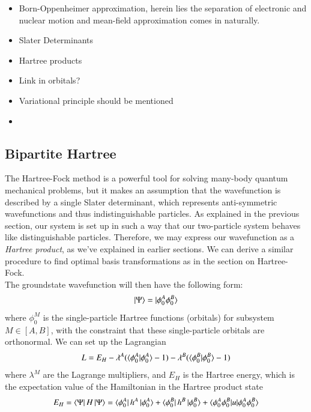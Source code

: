 \documentclass{subfiles}
\begin{document}
\begin{itemize}
    \item Born-Oppenheimer approximation, herein lies the separation of electronic and nuclear motion and mean-field approximation comes in naturally.
    \item Slater Determinants
    \item Hartree products
    \item Link in orbitals?
    \item Variational principle should be mentioned
    \item 
\end{itemize}

\subsection{Bipartite Hartree}\label{sec:bipartite_H}
The Hartree-Fock method is a powerful tool for solving many-body quantum mechanical problems, but it makes an assumption that the wavefunction is described by a single Slater determinant, which represents anti-symmetric wavefunctions and thus indistinguishable particles. As explained in the previous section, our system is set up in such a way that our two-particle system behaves like distinguishable particles. Therefore, we may express our wavefunction as a \emph{Hartree product}, as we've explained in earlier sections. We can derive a similar procedure to find optimal basis transformations as in the section on Hartree-Fock. \\
The groundstate wavefunction will then have the following form:
\begin{align*}
    \ket{\Psi} = \ket{\phi^A_0\phi^B_0}
\end{align*}
where $\phi_0^M$ is the single-particle Hartree functions (orbitals) for subsystem $M\in[A,B]$, with the constraint that these single-particle orbitals are orthonormal. We can set up the Lagrangian
\begin{align*}
    L = E_H - \lambda^A(\braket{\phi^A_0|\phi^A_0} - 1) - \lambda^B(\braket{\phi^B_0|\phi^B_0} - 1)
\end{align*}
where $\lambda^M$ are the Lagrange multipliers, and $E_H$ is the Hartree energy, which is the expectation value of the Hamiltonian in the Hartree product state
\begin{align*}
    E_H = \bra{\Psi}H\ket{\Psi} = \bra{\phi^A_0}h^A\ket{\phi^A_0} + \bra{\phi^B_0}h^B\ket{\phi^B_0} + \braket{\phi^A_0\phi^B_0|u|\phi^A_0\phi^B_0}
\end{align*}
\end{document}
